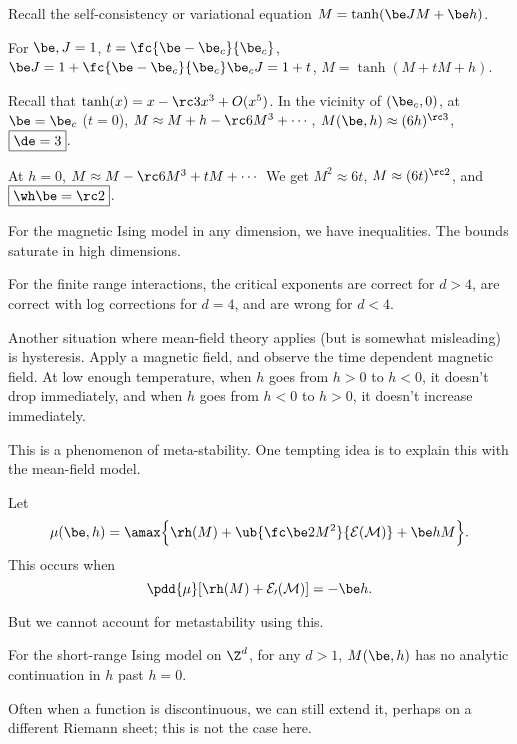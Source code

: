 

Recall the self-consistency or variational equation $M=\tanh(\be J M + \be h)$. 

For $\be, J=1$, $t=\fc{\be - \be_c}{\be_c}$, $\be J = 1+\fc{\be - \be_c}{\be_c} \be_cJ = 1+t$, $M=\tanh(M+tM+h)$.

Recall that $\tanh(x) = x-\rc 3x^3 + O(x^5)$. In the vicinity of $(\be_c,0)$, at $\be = \be_c$ ($t=0$), $M\approx M+h- \rc 6 M^3 + \cdots$, $M(\be, h) \approx (6h)^{\rc 3}$, $\boxed{\de = 3}$. 

At $h=0$, $M\approx M-\rc 6 M^3 + tM + \cdots$ %
We get $M^2 \approx 6t$, $M\approx (6t)^{\rc 2}$, and $\boxed{\wh \be = \rc 2}$.

For the magnetic Ising model in any dimension, we have inequalities. The bounds saturate in high dimensions.

For the finite range interactions, the critical exponents are correct for $d>4$, are correct with log corrections for $d=4$, and are wrong for $d<4$.

Another situation where mean-field theory applies (but is somewhat misleading) is hysteresis. Apply a magnetic field, and observe the time dependent magnetic field. At low enough temperature, when $h$ goes from $h>0$ to $h<0$, it doesn't drop immediately, and when $h$ goes from $h<0$ to $h>0$, it doesn't increase immediately.


This is a phenomenon of meta-stability.
One tempting idea is to explain this with the mean-field model.

Let 
\[\mu(\be,h)=\amax\Big\{\rh(M)+\ub{\fc\be2M^2}{\cal E(M)} + \be hM\Big\}.\]
This occurs when 
\[
\pdd{\mu} [\rh(M) + \cal E_0(M)] = -\be h.
\]

But we cannot account for metastability using this.

\begin{thm}
For the short-range Ising model on $\Z^d$, for any $d>1$, $M(\be, h)$ has no analytic continuation in $h$ past $h=0$.
\end{thm}
Often when a function is discontinuous, we can still extend it, perhaps on a different Riemann sheet; this is not the case here.

